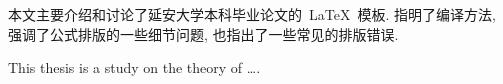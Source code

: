 \begin{cnabstract}
本文主要介绍和讨论了延安大学本科毕业论文的~\LaTeX~模板.
指明了编译方法, 强调了公式排版的一些细节问题, 也指出了一些常见的排版错误.



\end{cnabstract}
\par
\vspace*{2em}






\begin{enabstract}
This thesis is a study on the theory of \dots.

\end{enabstract}
\par
\vspace*{2em}

 \enkeywords{\LaTeX{};  }
